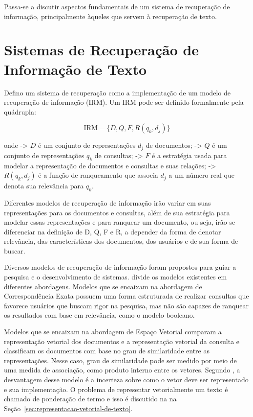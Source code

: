 \documentclass[
	12pt,				%
	openright,			%
	oneside,			%
	a4paper,			%
	english,			%
	french,				%
	spanish,			%
	brazil				%
	]{abntex2}
\begin{document}
Passa-se a discutir aspectos fundamentais de um sistema de recuperação de informação, principalmente àqueles que
servem à recuperação de texto.

\section{Sistemas de Recuperação de Informação de Texto}\label{sec:sistemas-de-recuperacao-de-informacao-de-texto}

Defino um sistema de recuperação como a implementação de um modelo de recuperação de informação (IRM).
Um IRM pode ser definido formalmente pela quádrupla: 

$$\text{IRM} = \{D, Q, F, R(q_k, d_j)\}$$

onde
-> $D$ é um conjunto de representações $d_j$ de documentos;
-> $Q$ é um conjunto de representações $q_k$ de consultas;
-> $F$ é a estratégia usada para modelar a representação de documentos e consultas e suas relações;
-> $R(q_k, d_j)$ é a função de ranqueamento que associa $d_j$ a um número real que denota sua relevância para $q_k$.

Diferentes modelos de recuperação de informação irão variar em suas representações para os documentos e consultas,
além de sua estratégia para modelar essas representações e para ranquear um documento, ou seja,
irão se diferenciar na definição de D, Q, F e R, a depender da forma de denotar relevância, das
características dos documentos, dos usuários e de sua forma de buscar.

Diversos modelos de recuperação de informação foram propostos para guiar a pesquisa e o desenvolvimento
de sistemas.
\citeauthor{Hiemstra2009} divide os modelos existentes em diferentes abordagens.
Modelos que se encaixam na abordagem de Correspondência Exata possuem uma forma estruturada
de realizar consultas que favorece usuários que buscam rigor na pesquisa, mas não
são capazes de ranquear os resultados com base em relevância, como o modelo booleano.

Modelos que se encaixam na abordagem de Espaço Vetorial comparam a representação vetorial dos documentos e a representação
vetorial da consulta e classificam os documentos com base no grau de similaridade entre as representações.
Nesse caso, grau de similaridade pode ser medido por meio de uma medida de associação, como produto interno entre
os vetores.
Segundo \citeauthor{Hiemstra2009}, a desvantagem desse modelo é a incerteza sobre como o vetor deve ser representado e
sua implementação.
O problema de representar vetorialmente um texto é chamado de ponderação de termo e isso é discutido na
na Seção~\ref{sec:representacao-vetorial-de-texto}.
\end{document}
